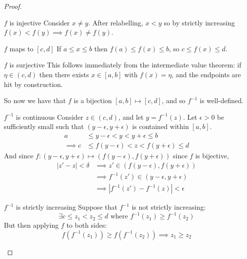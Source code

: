 \documentclass[../Main.tex]{subfiles}
\begin{document}
\begin{proof}
    \begin{subproof}{$f$ is injective}
        Consider $x \neq y$. After relabelling, $x < y$ so by strictly increasing $f(x) < f(y) \implies f(x) \neq f(y)$.
    \end{subproof}
    \begin{subproof}{$f$ maps to $[c, d]$}
        If $a \leq x \leq b$ then $f(a) \leq f(x) \leq b$, so $c \leq f(x) \leq d$.
    \end{subproof}
    \begin{subproof}{$f$ is surjective}
        This follows immediately from the intermediate value theorem: if $\eta \in (c, d)$ then there exists $x \in [a, b]$ with $f(x) = \eta$, and the endpoints are hit by construction.
    \end{subproof}
    So now we have that $f$ is a bijection $[a, b] \mapsto [c, d]$, and so $f^{-1}$ is well-defined.
    \begin{subproof}{$f^{-1}$ is continuous}
        Consider $z \in (c, d)$, and let $y = f^{-1}(z)$. Let $\epsilon > 0$ be sufficiently small such that $(y - \epsilon, y + \epsilon)$ is contained within $[a, b]$.
        \begin{align*}
            a &\leq y - \epsilon < y < y + \epsilon \leq b \\
            \implies c &\leq f(y-\epsilon) < z < f(y + \epsilon) \leq d
        \end{align*}
        And since $f : (y - \epsilon, y + \epsilon) \mapsto (f(y - \epsilon), f(y + \epsilon))$ since $f$ is bijective,
        \begin{align*}
            |z' - z| < \delta &\implies z' \in (f(y - \epsilon), f(y + \epsilon)) \\
            &\implies f^{-1}(z') \in (y - \epsilon, y + \epsilon) \\
            &\implies |f^{-1}(z') - f^{-1}(z)| < \epsilon
        \end{align*}
    \end{subproof}
    \begin{subproof}{$f^{-1}$ is strictly increasing}
        Suppose that $f^{-1}$ is not strictly increasing:
        \begin{equation*}
            \exists c \leq z_1 < z_2 \leq d \text{ where } f^{-1}(z_1) \geq f^{-1}(z_2)
        \end{equation*}
        But then applying $f$ to both sides:
        \begin{equation*}
            f(f^{-1}(z_1)) \geq f(f^{-1}(z_2)) \implies z_1 \geq z_2
        \end{equation*}
        \contradiction
    \end{subproof}
\end{proof}
\end{document}
